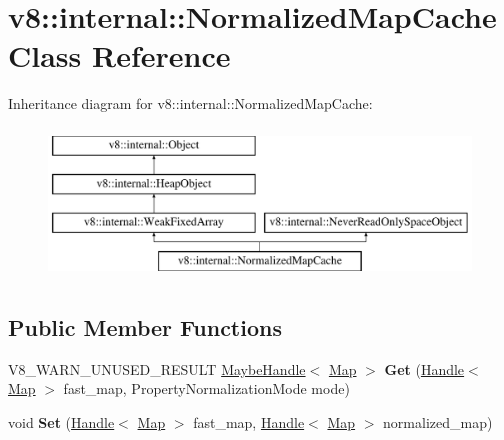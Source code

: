 \hypertarget{classv8_1_1internal_1_1NormalizedMapCache}{}\section{v8\+:\+:internal\+:\+:Normalized\+Map\+Cache Class Reference}
\label{classv8_1_1internal_1_1NormalizedMapCache}
Inheritance diagram for v8\+:\+:internal\+:\+:Normalized\+Map\+Cache\+:\begin{figure}[H]
\begin{center}
\leavevmode
\includegraphics[height=4.000000cm]{classv8_1_1internal_1_1NormalizedMapCache}
\end{center}
\end{figure}
\subsection*{Public Member Functions}
\begin{DoxyCompactItemize}
\item 
\mbox{\label{classv8_1_1internal_1_1NormalizedMapCache_a503caab7bc065d42afa3b68c73699ccf}} 
V8\+\_\+\+W\+A\+R\+N\+\_\+\+U\+N\+U\+S\+E\+D\+\_\+\+R\+E\+S\+U\+LT \mbox{\hyperlink{classv8_1_1internal_1_1MaybeHandle}{Maybe\+Handle}}$<$ \mbox{\hyperlink{classv8_1_1internal_1_1Map}{Map}} $>$ {\bfseries Get} (\mbox{\hyperlink{classv8_1_1internal_1_1Handle}{Handle}}$<$ \mbox{\hyperlink{classv8_1_1internal_1_1Map}{Map}} $>$ fast\+\_\+map, Property\+Normalization\+Mode mode)
\item 
\mbox{\label{classv8_1_1internal_1_1NormalizedMapCache_ae23fb7f8d42ba9350ade6f64bed55054}} 
void {\bfseries Set} (\mbox{\hyperlink{classv8_1_1internal_1_1Handle}{Handle}}$<$ \mbox{\hyperlink{classv8_1_1internal_1_1Map}{Map}} $>$ fast\+\_\+map, \mbox{\hyperlink{classv8_1_1internal_1_1Handle}{Handle}}$<$ \mbox{\hyperlink{classv8_1_1internal_1_1Map}{Map}} $>$ normalized\+\_\+map)
\end{DoxyCompactItemize}
